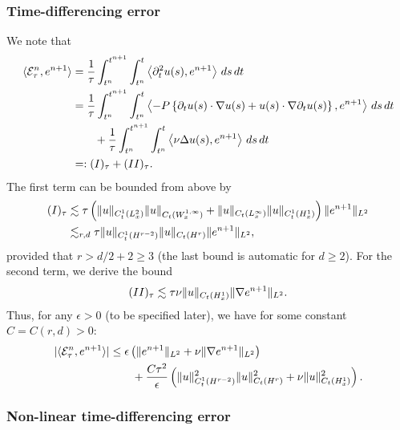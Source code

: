 \documentclass[reqno,a4paper]{amsart}
\begin{document}
\subsubsection{Time-differencing error}
We note that 
\begin{align*}
\langle \mathcal{E}^n_{{\tau}}, e^{n+1}\rangle
&=
\frac1{{\tau}} \int_{t^n}^{t^{n+1}}
\int_{t^n}^t
\left
\langle
\partial_t^2 u(s)
,
e^{n+1}
\right
\rangle
\, ds
\, dt
\\
&=
\frac1{{\tau}} \int_{t^n}^{t^{n+1}}
\int_{t^n}^t
\left
\langle
-P
\left\{
\partial_t u(s)\cdot \nabla u(s) + u(s)\cdot \nabla \partial_t u(s)
\right\}
,
e^{n+1}
\right
\rangle
\, ds
\, dt
\\
&\qquad + 
\frac1{{\tau}} \int_{t^n}^{t^{n+1}}
\int_{t^n}^t
\left
\langle
\nu \Delta u(s)
,
e^{n+1}
\right
\rangle
\, ds
\, dt
\\
&=: (I)_{\tau} + (II)_{\tau}.
\end{align*}
The first term can be bounded from above by
\begin{align*}
(I)_{\tau} &\lesssim
{\tau} \left(
\Vert u \Vert_{C^1_t(L^2_x)} \Vert u \Vert_{C_t(W^{1,\infty}_x)} + \Vert u \Vert_{C_t(L^\infty_x)} \Vert u \Vert_{C^1_t(H^1_x)}
\right) \Vert e^{n+1} \Vert_{L^2}
\\
&\lesssim_{r,d}
{\tau} \Vert u \Vert_{C^1_t(H^{r-2})} \Vert u \Vert_{C_t(H^r)} \Vert e^{n+1}\Vert_{L^2},
\end{align*}
provided that $r > d/2+2 \ge 3$ (the last bound is automatic for $d\ge 2$). For the second term, we derive the bound
\[
(II)_{\tau}\lesssim
{\tau} \nu \Vert u \Vert_{C_t(H^1_x)} \Vert \nabla e^{n+1} \Vert_{L^2}.
\]
Thus, for any $\epsilon> 0$ (to be specified later), we have for some constant $C = C(r,d)> 0$:
\begin{gather} \label{eq:err-dt}
\begin{aligned}
|\langle \mathcal{E}^n_{{\tau}} , e^{n+1} \rangle |
&\le
\epsilon\left( \Vert e^{n+1} \Vert_{L^2} + \nu \Vert \nabla e^{n+1} \Vert_{L^2} \right)
\\
&\qquad 
+
\frac{C {\tau}^2 }{ \epsilon } \left( 
\Vert u \Vert_{C^1_t(H^{r-2})}^2 \Vert u \Vert_{C_t(H^r)}^2
+
\nu\Vert u \Vert_{C_t(H^1_x)}^2
\right).
\end{aligned}
\end{gather}

\subsubsection{Non-linear time-differencing error}
\end{document}
